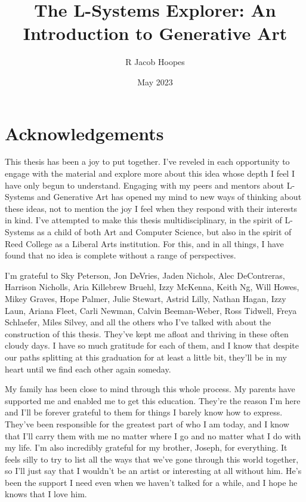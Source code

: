 \documentclass[12pt,twoside]{reedthesis}
\title{The L-Systems Explorer: An Introduction to Generative Art} %
\author{R Jacob Hoopes}
\date{May 2023}
\begin{document}
  \maketitle
  \frontmatter %
  \pagestyle{empty} %

    \chapter*{Acknowledgements}
	This thesis has been a joy to put together. I've reveled in each opportunity to engage with the material and explore more about this idea whose depth I feel I have only begun to understand. Engaging with my peers and mentors about L-Systems and Generative Art has opened my mind to new ways of thinking about these ideas, not to mention the joy I feel when they respond with their interests in kind. I've attempted to make this thesis multidisciplinary, in the spirit of L-Systems as a child of both Art and Computer Science, but also in the spirit of Reed College as a Liberal Arts institution. For this, and in all things, I have found that no idea is complete without a range of perspectives.
	
	I'm grateful to Sky Peterson, Jon DeVries, Jaden Nichols, Alec DeContreras, Harrison Nicholls, Aria Killebrew Bruehl, Izzy McKenna, Keith Ng, Will Howes, Mikey Graves, Hope Palmer, Julie Stewart, Astrid Lilly, Nathan Hagan, Izzy Laun, Ariana Fleet, Carli Newman, Calvin Beeman-Weber, Ross Tidwell, Freya Schlaefer, Miles Silvey, and all the others who I've talked with about the construction of this thesis. They've kept me afloat and thriving in these often cloudy days. I have so much gratitude for each of them, and I know that despite our paths splitting at this graduation for at least a little bit, they'll be in my heart until we find each other again someday.
	
	My family has been close to mind through this whole process. My parents have supported me and enabled me to get this education. They're the reason I'm here and I'll be forever grateful to them for things I barely know how to express. They've been responsible for the greatest part of who I am today, and I know that I'll carry them with me no matter where I go and no matter what I do with my life. I'm also incredibly grateful for my brother, Joseph, for everything. It feels silly to try to list all the ways that we've gone through this world together, so I'll just say that I wouldn't be an artist or interesting at all without him. He's been the support I need even when we haven't talked for a while, and I hope he knows that I love him.
	
\end{document}
